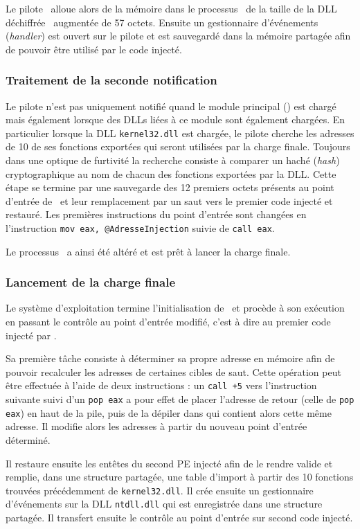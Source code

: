 Le pilote \driver\ alloue alors de la mémoire dans le processus \services\ de la taille de la DLL déchiffrée \netpDLL\ augmentée de 57 octets.
Ensuite un gestionnaire d’événements (\emph{handler}) est ouvert sur le pilote et est sauvegardé dans la mémoire partagée afin de pouvoir être utilisé par le code injecté.

\subsubsection{Traitement de la seconde notification}
Le pilote n'est pas uniquement notifié quand le module principal (\services) est chargé mais également lorsque des DLLs liées à ce module sont également chargées.
En particulier lorsque la DLL \texttt{kernel32.dll} est chargée, le pilote cherche les adresses de 10 de ses fonctions exportées qui seront utilisées par la charge finale.
Toujours dans une optique de furtivité la recherche consiste à comparer un haché (\emph{hash}) cryptographique au nom de chacun des fonctions exportées par la DLL.
Cette étape se termine par une sauvegarde des 12 premiers octets présents au point d'entrée de \services\ et leur remplacement par un saut vers le premier code injecté et restauré.
Les premières instructions du point d'entrée sont changées en l'instruction \texttt{mov eax, @AdresseInjection} suivie de \texttt{call eax}.

Le processus \services\ a ainsi été altéré et est prêt à lancer la charge finale.

\subsubsection{Lancement de la charge finale}
Le système d'exploitation termine l'initialisation de \services\ et procède à son exécution en passant le contrôle au point d'entrée modifié, c'est à dire au premier code injecté par \duqu.

Sa première tâche consiste à déterminer sa propre adresse en mémoire afin de pouvoir recalculer les adresses de certaines cibles de saut.
Cette opération peut être effectuée à l'aide de deux instructions : un \texttt{call +5} vers l'instruction suivante suivi d'un \texttt{pop eax} a pour effet de placer l'adresse de retour (celle de \texttt{pop eax}) en haut de la pile, puis de la dépiler dans \eax qui contient alors cette même adresse.
Il modifie alors les adresses à partir du nouveau point d'entrée déterminé.

Il restaure ensuite les entêtes du second PE injecté afin de le rendre valide et remplie, dans une structure partagée, une table d'import à partir des 10 fonctions trouvées précédemment de \texttt{kernel32.dll}.
Il crée ensuite un gestionnaire d’événements sur la DLL \texttt{ntdll.dll} qui est enregistrée dans une structure partagée.
Il transfert ensuite le contrôle au point d'entrée sur second code injecté.

